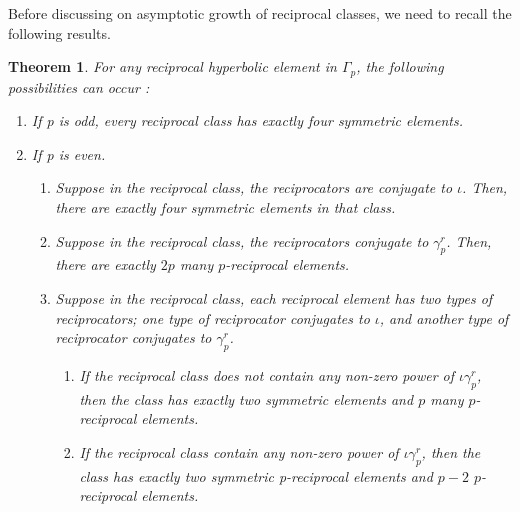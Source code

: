 \documentclass[11pt]{amsart}
\numberwithin{equation}{section}
\newtheorem{theorem}{Theorem}[section]
\newcommand{\g}{\gamma_{p}}
\numberwithin{equation}{section}
\begin{document}
	Before discussing on asymptotic growth of reciprocal classes, we need to recall the following results.
	\begin{theorem}{\cite{DG}}\label{th}
		For any reciprocal hyperbolic element in $ \Gamma_{p} $, the following possibilities can occur :
		\begin{enumerate}
			\item If p is odd, every reciprocal class has exactly four symmetric elements.
			\item If p is even.
			\begin{enumerate}
				\item Suppose in the reciprocal class, the reciprocators are conjugate to $ \iota $. Then, there are exactly four symmetric elements in that class.
				\item Suppose in the reciprocal class, the reciprocators conjugate to $\gamma_{p}^{r} $. Then, there are exactly $ 2p $ many $p$-reciprocal elements. 
				\item Suppose in the reciprocal class, each reciprocal element has two types of reciprocators; one type of reciprocator conjugates to $ \iota $, and another type of reciprocator conjugates to $ \gamma_{p}^{r} $.
				\begin{enumerate}
					
					\item If the reciprocal class does not contain any non-zero power of $ \iota \g^r$, then the class has exactly two symmetric elements and $ p $ many $p$-reciprocal elements.
					
					
					\item If the reciprocal class contain any non-zero power of $ \iota \g^r$, then the class has exactly two symmetric p-reciprocal elements and $p-2$  $p$-reciprocal elements.			\end{enumerate}
			\end{enumerate}
		\end{enumerate}
		
	\end{theorem}
	
\end{document}

